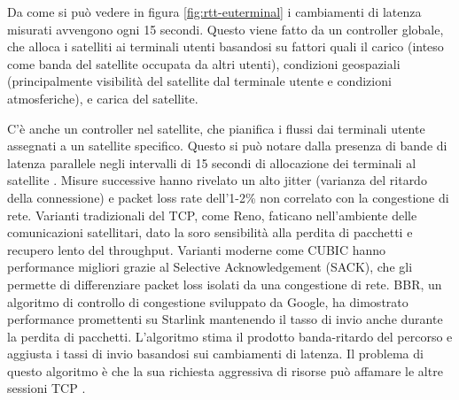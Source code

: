 Da come si può vedere in figura \ref{fig:rtt-euterminal} i cambiamenti di latenza misurati avvengono ogni 15 secondi.
Questo viene fatto da un controller globale, che alloca i satelliti ai terminali utenti basandosi su fattori quali il carico (inteso come banda del satellite occupata da altri utenti), condizioni geospaziali (principalmente visibilità del satellite dal terminale utente e condizioni atmosferiche), e carica del satellite.

C'è anche un controller nel satellite, che pianifica i flussi dai terminali utente assegnati a un satellite specifico.
Questo si può notare dalla presenza di bande di latenza parallele negli intervalli di 15 secondi di allocazione dei terminali al satellite \cite{tanveer_making_2023}.
Misure successive hanno rivelato un alto jitter (varianza del ritardo della connessione) e packet loss rate dell'1-2\% non correlato con la congestione di rete.
Varianti tradizionali del \ac{TCP}, come Reno, faticano nell'ambiente delle comunicazioni satellitari, dato la soro sensibilità alla perdita di pacchetti e recupero lento del throughput.
Varianti moderne come CUBIC hanno performance migliori grazie al Selective Acknowledgement (SACK), che gli permette di differenziare packet loss isolati da una congestione di rete.
BBR, un algoritmo di controllo di congestione sviluppato da Google, ha dimostrato performance promettenti su Starlink mantenendo il tasso di invio anche durante la perdita di pacchetti.
L'algoritmo stima il prodotto banda-ritardo del percorso e aggiusta i tassi di invio basandosi sui cambiamenti di latenza.
Il problema di questo algoritmo è che la sua richiesta aggressiva di risorse può affamare le altre sessioni TCP \cite{geoff_huston_transport_2024}.

